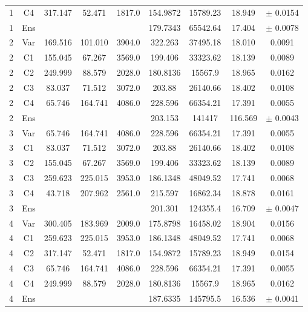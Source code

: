 \documentclass[12pt]{article}
\begin{document}
\begin{table}[H]
\begin{center}
\begin{tabular}{|c|c||c|c||c|c|c||c|c|}
 1&  C4  &317.147   &52.471     &1817.0          & 154.9872  & 15789.23  & 18.949& $\pm$ 0.0154\\
  1&  Ens  &    &      & & 179.7343  & 65542.64  & 17.404 & $\pm$ 0.0078\\
 \hline \hline
 2& Var & 169.516 & 101.010  &   3904.0   &    322.263  & 37495.18 &  18.010 &0.0091\\
 2&  C1 & 155.045 &  67.267   &  3569.0   & 199.406  & 33323.62   &18.139 &0.0089\\
 2&  C2  &249.999  & 88.579    & 2028.0    & 180.8136 &   15567.9  & 18.965& 0.0162\\
 2&  C3   &83.037  & 71.512     &3072.0      &  203.88  & 26140.66   &18.402& 0.0108\\
 2&  C4   &65.746  &164.741     &4086.0      & 228.596  & 66354.21   &17.391& 0.0055\\
   2&  Ens  &    &      &  & 203.153  & 141417  & 116.569 & $\pm$ 0.0043\\
 \hline \hline
 3& Var &  65.746  &164.741   &  4086.0  &  228.596 &  66354.21 &  17.391& 0.0055 \\
 3&  C1  & 83.037   &71.512     &3072.0  &203.88  & 26140.66   &18.402 &0.0108\\
 3&  C2  &155.045   &67.267    & 3569.0   & 199.406 &  33323.62 &  18.139 &0.0089\\
 3&  C3  &259.623  &225.015   &  3953.0   &186.1348  & 48049.52  & 17.741& 0.0068\\
 3&  C4   &43.718  &207.962     &2561.0     & 215.597   &16862.34  & 18.878& 0.0161\\
   3&  Ens  &    &      &  & 201.301  & 124355.4  & 16.709 & $\pm$ 0.0047\\
 \hline \hline
 4&  Var & 300.405  &183.969   &  2009.0    & 175.8798  & 16458.02 &  18.904 &0.0156 \\
 4&  C1 & 259.623 & 225.015    & 3953.0   & 186.1348  & 48049.52  & 17.741& 0.0068\\
 4&  C2  &317.147  & 52.471  & 1817.0   &154.9872  & 15789.23 &  18.949 & 0.0154\\
 4&  C3   &65.746  &164.741   & 4086.0   & 228.596  & 66354.21 &  17.391 & 0.0055\\
 4&  C4  &249.999  & 88.579  & 2028.0 & 180.8136   & 15567.9  & 18.965& 0.0162\\
   4&  Ens  &    &      & & 187.6335  & 145795.5  & 16.536 & $\pm$ 0.0041\\
 \hline 
 \end{tabular} \\[0.5cm]

\end{center}
\end{table}
\end{document}
